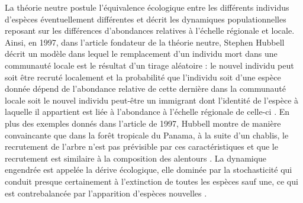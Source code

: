 La théorie neutre postule l'équivalence écologique entre les différents
individus d'espèces éventuellement différentes et décrit les dynamiques
populationnelles reposant sur les différences d'abondances relatives à
l'échelle régionale et locale. Ainsi, en 1997, dans l'article fondateur
de la théorie neutre, Stephen Hubbell décrit un modèle dans lequel le
remplacement d'un individu mort dans une communauté locale est le
résultat d'un tirage aléatoire : le nouvel individu peut soit être
recruté localement et la probabilité que l'individu soit d'une espèce
donnée dépend de l'abondance relative de cette dernière dans la
communauté locale soit le nouvel individu peut-être un immigrant dont
l'identité de l'espèce à laquelle il appartient est liée à l'abondance à
l'échelle régionale de celle-ci \citep{Hubbell1997}. En plus des
exemples donnés dans l'article de 1997, Hubbell montre de manière
convaincante que dans la forêt tropicale du Panama, à la suite d'un
chablis, le recrutement de l'arbre n'est pas prévisible par ces
caractéristiques et que le recrutement est similaire à la composition
des alentours \citep{Hubbell1999}. La dynamique engendrée est appelée la
dérive écologique, elle dominée par la stochasticité qui conduit presque
certainement à l'extinction de toutes les espèces sauf une, ce qui est
contrebalancée par l'apparition d'espèces nouvelles
\citep{Hubbell2010, Ricklefs2003}.

